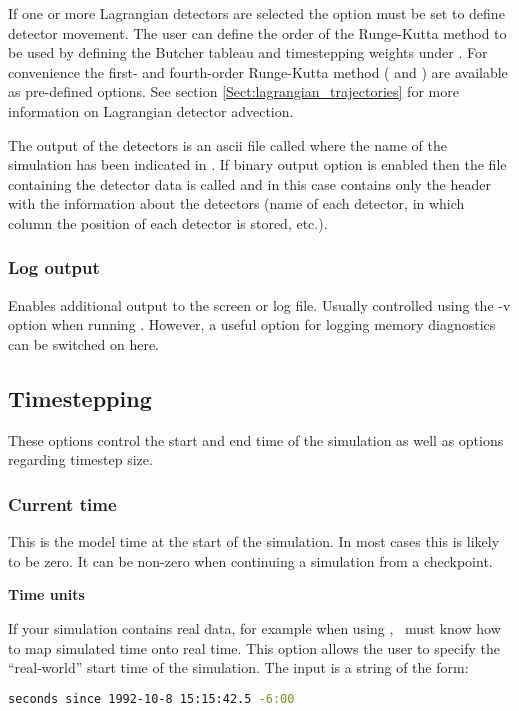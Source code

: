 If one or more Lagrangian detectors are selected the option  must be set to define detector movement. 
The user can define the order of the Runge-Kutta method to be used by defining the Butcher tableau and timestepping weights under . 
For convenience the first- and fourth-order Runge-Kutta method ( and ) are available as pre-defined options. 
See section \ref{Sect:lagrangian_trajectories} for more information on Lagrangian detector advection.

The output of the detectors is an ascii file called
 where the name of the simulation has
been indicated in . If binary output
  option is enabled then the file containing the detector data is called
 and in this case  contains only the header with the
information about the detectors (name of each detector, in which column the
position of each detector is stored, etc.).

\subsubsection{Log output}

Enables additional output to the screen or log file. Usually controlled
using the -v option when running \fluidity. However, a useful option for
logging memory diagnostics can be switched on here.

\subsection{Timestepping}
These options control the start and end time of the simulation as well as options regarding timestep size.

\subsubsection{Current time}
This is the model time at the start of the simulation. In most cases this is likely to be zero. It can be non-zero when continuing a simulation from a checkpoint.

\textbf{Time units}

If your simulation contains real data, for example when using
, \fluidity\ must know how to map simulated time onto
real time. This option allows the user to specify the ``real-world'' start
time of the simulation.  The input is a string of the form:
\begin{lstlisting}[language=bash]
seconds since 1992-10-8 15:15:42.5 -6:00 
\end{lstlisting} 

